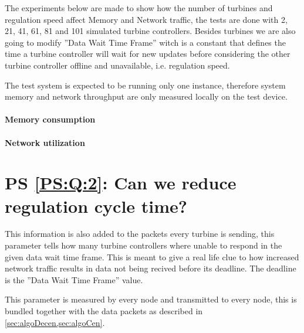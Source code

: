 The experiments below are made to show how the number of turbines and regulation speed affect Memory and Network traffic, the tests are done with 2, 21, 41, 61, 81 and 101 simulated turbine controllers. Besides turbines we are also going to modify ''Data Wait Time Frame'' witch is a constant that defines the time a turbine controller will wait for new updates before considering the other turbine controller offline and unavailable, i.e. regulation speed.

The test system is expected to be running only one instance, therefore system memory and network throughput are only measured locally on the test device.

\paragraph{Memory consumption} 
\paragraph{Network utilization}

\section{PS \ref{PS:Q:2}: Can we reduce regulation cycle time?}
This information is also added to the packets every turbine is sending, this parameter tells how many turbine controllers where unable to respond in the given data wait time frame. This is meant to give a real life clue to how increased network traffic results in data not being recived before its deadline. The deadline is the ''Data Wait Time Frame'' value.

This parameter is measured by every node and transmitted to every node, this is bundled together with the data packets as described in \cref{sec:algoDecen,sec:algoCen}.
